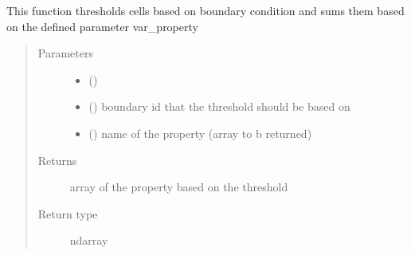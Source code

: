 \documentclass[letterpaper,10pt,english]{sphinxmanual}
\begin{document}
\begin{fulllineitems}
\begin{fulllineitems}
\begin{quote}
\begin{description}
\end{description}\end{quote}

\end{fulllineitems}


\begin{fulllineitems}
\label{\detokenize{openfdem:openfdem.openfdem.Model.platen_info}}
This function thresholds cells based on boundary condition and sums them based on the defined parameter var\_property
\begin{quote}\begin{description}
\item[{Parameters}] \leavevmode\begin{itemize}
\item {} 
 () \textendash{} 

\item {} 
 () \textendash{} boundary id that the threshold should be based on

\item {} 
 (\sphinxstyleliteralemphasis{\sphinxupquote{{[}}}\sphinxstyleliteralemphasis{\sphinxupquote{, }}\sphinxstyleliteralemphasis{\sphinxupquote{{]}}}) \textendash{} name of the property (array to b returned)

\end{itemize}

\item[{Returns}] \leavevmode
array of the property based on the threshold

\item[{Return type}] \leavevmode
ndarray

\end{description}\end{quote}


\end{fulllineitems}
\end{fulllineitems}
\end{document}
